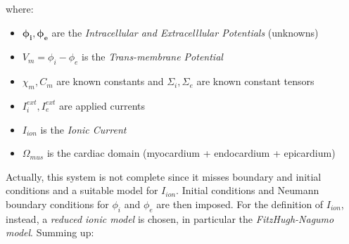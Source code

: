 \documentclass[a4paper,11pt]{article}
\begin{document}
	where:
	\begin{itemize}[label=\textendash]
		\item $\bm{\phi_i, \phi_e}$ are the \emph{Intracellular and Extracelllular Potentials} (unknowns)
		\item $V_m = \phi_i-\phi_e$ is the \emph{Trans-membrane Potential}
		\item $\chi_m,C_m$ are known constants and $\Sigma_i, \Sigma_e$ are known constant tensors 
		\item $I_i^{ext},I_e^{ext}$ are applied currents
		\item $I_{ion}$ is the \emph{Ionic Current}
		\item $\Omega_{mus}$ is the cardiac domain (myocardium + endocardium + epicardium)
	\end{itemize}
    
    \vspace{4mm}
    \noindent Actually, this system is not complete since it misses boundary and initial conditions and a suitable model for $I_{ion}$. Initial conditions and Neumann boundary conditions for $\phi_i$ and $\phi_e$ are then imposed. For the definition of $I_{ion}$, instead, a \emph{reduced ionic model} is chosen, in particular the \emph{FitzHugh-Nagumo model}. Summing up:
    
\end{document}
